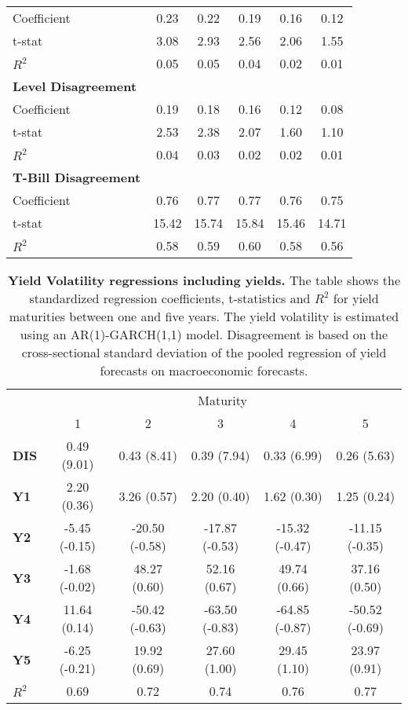 \begin{table}[H]
\begin{tabular}{lccccc}
Coefficient & 0.23 & 0.22 & 0.19 & 0.16 & 0.12 \\
t-stat & 3.08 & 2.93 & 2.56 & 2.06 & 1.55 \\
$R^2$ & 0.05 & 0.05 & 0.04 & 0.02 & 0.01 \\
\hline
\textbf{Level Disagreement} \\
Coefficient & 0.19 & 0.18 & 0.16 & 0.12 & 0.08 \\
t-stat & 2.53 & 2.38 & 2.07 & 1.60 & 1.10 \\
$R^2$ & 0.04 & 0.03 & 0.02 & 0.02 & 0.01 \\
\hline
\textbf{T-Bill Disagreement} \\
Coefficient & 0.76 & 0.77 & 0.77 & 0.76 & 0.75 \\
t-stat & 15.42 & 15.74 & 15.84 & 15.46 & 14.71 \\
$R^2$ & 0.58 & 0.59 & 0.60 & 0.58 & 0.56 \\
\hline
\hline
\end{tabular}
\label{table:Vola2Dis}
\end{table}

\begin{table}[H]
\centering
\caption{\textbf{Yield Volatility regressions including yields.} The table shows the standardized regression coefficients, t-statistics and $R^2$ for yield maturities between one and five years. The yield volatility is estimated using an AR(1)-GARCH(1,1) model. Disagreement is based on the cross-sectional standard deviation of the pooled regression of yield forecasts on macroeconomic forecasts.}
\begin{tabular}{lccccc}
\hline
\hline
& \multicolumn{5}{c}{Maturity} \\
& 1 & 2 & 3 & 4 & 5 \\
\hline
\textbf{DIS} & 0.49 (9.01) & 0.43 (8.41) & 0.39 (7.94) & 0.33 (6.99) & 0.26 (5.63) \\
\textbf{Y1} & 2.20 (0.36) & 3.26 (0.57) & 2.20 (0.40) & 1.62 (0.30) & 1.25 (0.24) \\
\textbf{Y2} & -5.45 (-0.15) & -20.50 (-0.58) & -17.87 (-0.53) & -15.32 (-0.47) & -11.15 (-0.35) \\
\textbf{Y3} & -1.68 (-0.02) & 48.27 (0.60) & 52.16 (0.67) & 49.74 (0.66) & 37.16 (0.50) \\
\textbf{Y4} & 11.64 (0.14) & -50.42 (-0.63) & -63.50 (-0.83) & -64.85 (-0.87) & -50.52 (-0.69) \\
\textbf{Y5} & -6.25 (-0.21) & 19.92 (0.69) & 27.60 (1.00) & 29.45 (1.10) & 23.97 (0.91) \\
\hline
\textbf{$R^2$} & 0.69 & 0.72 & 0.74 & 0.76 & 0.77 \\
\hline
\hline
\end{tabular}
\label{table:Vola2Dis_Yields}
\end{table}



